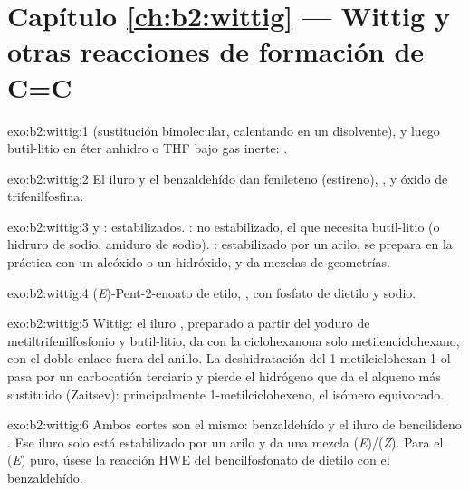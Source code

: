 \section*{Capítulo \ref{ch:b2:wittig} --- Wittig y otras reacciones de formación de C=C}

\begin{solution}{exo:b2:wittig:1}
 (sustitución bimolecular, calentando en un disolvente), y luego
butil-litio en éter anhidro o THF bajo gas inerte: .
\end{solution}

\begin{solution}{exo:b2:wittig:2}
El iluro  y el benzaldehído dan fenileteno (estireno), , y
óxido de trifenilfosfina.
\end{solution}

\begin{solution}{exo:b2:wittig:3}
 y : estabilizados. : no estabilizado, el que
necesita butil-litio (o hidruro de sodio, amiduro de sodio). : estabilizado por un arilo, se prepara en la práctica con un
alcóxido o un hidróxido, y da mezclas de geometrías.
\end{solution}

\begin{solution}{exo:b2:wittig:4}
(\textit{E})-Pent-2-enoato de etilo, , con fosfato de dietilo y sodio.
\end{solution}

\begin{solution}{exo:b2:wittig:5}
Wittig: el iluro , preparado a partir del yoduro de metiltrifenilfosfonio y butil-litio, da con la ciclohexanona solo
metilenciclohexano, con el doble enlace fuera del anillo. La deshidratación del 1-metilciclohexan-1-ol pasa
por un carbocatión terciario y pierde el hidrógeno que da el alqueno más sustituido (Zaitsev):
principalmente 1-metilciclohexeno, el isómero equivocado.
\end{solution}

\begin{solution}{exo:b2:wittig:6}
Ambos cortes son el mismo: benzaldehído y el iluro de bencilideno . Ese iluro solo está
estabilizado por un arilo y da una mezcla (\textit{E})/(\textit{Z}). Para el (\textit{E}) puro, úsese la reacción
HWE del bencilfosfonato de dietilo con el benzaldehído.
\end{solution}

